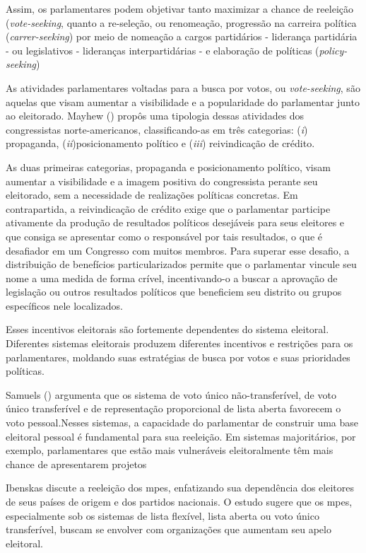 Assim, os parlamentares podem objetivar tanto maximizar a chance de reeleição (\textit{vote-seeking}, quanto a re-seleção, ou renomeação, progressão na carreira política (\textit{carrer-seeking}) por meio de nomeação a cargos partidários - liderança partidária - ou legislativos - lideranças interpartidárias - \cite{strom1997rules} e elaboração de políticas (\textit{policy-seeking}) \cite{muller1999}

As atividades parlamentares voltadas para a busca por votos, ou \textit{vote-seeking}, são aquelas que visam aumentar a visibilidade e a popularidade do parlamentar junto ao eleitorado. Mayhew (\citeyear{mayhew2004congress}) propôs uma tipologia dessas atividades dos congressistas norte-americanos, classificando-as em três categorias: (\textit{i}) propaganda, (\textit{ii})posicionamento político e (\textit{iii}) reivindicação de crédito. 

As duas primeiras categorias, propaganda e posicionamento político, visam aumentar a visibilidade e a imagem positiva do congressista perante seu eleitorado, sem a necessidade de realizações políticas concretas. Em contrapartida, a reivindicação de crédito exige que o parlamentar participe ativamente da produção de resultados políticos desejáveis para seus eleitores e que consiga se apresentar como o responsável por tais resultados, o que é desafiador em um Congresso com muitos membros. Para superar esse desafio, a distribuição de benefícios particularizados permite que o parlamentar vincule seu nome a uma medida de forma crível, incentivando-o a buscar a aprovação de legislação ou outros resultados políticos que beneficiem seu distrito ou grupos específicos nele localizados.

Esses incentivos eleitorais são fortemente dependentes do sistema eleitoral. Diferentes sistemas eleitorais produzem diferentes incentivos e restrições para os parlamentares, moldando suas estratégias de busca por votos e suas prioridades políticas. 

Samuels (\citeyear{samuels1997determinantes}) argumenta que os sistema de voto único não-transferível, de voto único transferível e de representação proporcional de lista aberta favorecem o voto pessoal.Nesses sistemas, a capacidade do parlamentar de construir uma base eleitoral pessoal é fundamental para sua reeleição. Em sistemas majoritários, por exemplo, parlamentares que estão mais vulneráveis eleitoralmente têm mais chance de apresentarem projetos \cite{bowler2010private}

Ibenskas \citeyear{Ibenskas2021} discute a reeleição dos \acrshort{mpe}s, enfatizando sua dependência dos eleitores de seus países de origem e dos partidos nacionais. O estudo sugere que os \acrshort{mpe}s, especialmente sob os sistemas de lista flexível, lista aberta ou voto único transferível, buscam se envolver com organizações que aumentam seu apelo eleitoral.


